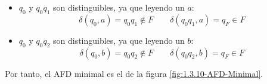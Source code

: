 \begin{ejercicio}
\begin{itemize}
        \item $q_0$ y $q_0q_1$ son distinguibles, ya que leyendo un $a$:
        \begin{equation*}
            \delta(q_0,a)=q_0q_1\notin F\qquad \delta(q_0q_1,a)=q_F\in F
        \end{equation*}

        \item $q_0$ y $q_0q_2$ son distinguibles, ya que leyendo un $b$:
        \begin{equation*}
            \delta(q_0,b)=q_0q_2\notin F\qquad \delta(q_0q_2,b)=q_F\in F
        \end{equation*}
    \end{itemize}

    Por tanto, el AFD minimal es el de la figura \ref{fig:1.3.10-AFD-Minimal}.
\end{ejercicio}

